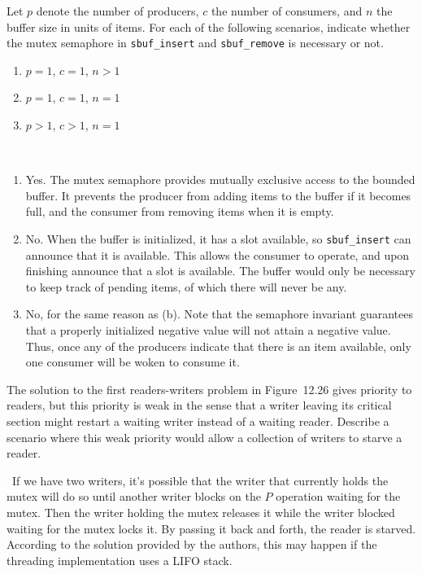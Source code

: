 \documentclass[12pt]{article}
\newenvironment{ex}[2][Exercise]{\begin{trivlist}
		\item[\hskip \labelsep {\bfseries #1}\hskip \labelsep {\bfseries #2.}]}{\end{trivlist}}
\newenvironment{sol}[1][Solution]{\begin{trivlist}
		\item[\hskip \labelsep {\bfseries #1:}]}{\end{trivlist}}
\begin{document}
\begin{ex}{12.9}
	Let $p$ denote the number of producers, $c$ the number of consumers, and $n$ the buffer size
	in units of items. For each of the following scenarios, indicate whether the mutex
	semaphore in \texttt{sbuf\_insert} and \texttt{sbuf\_remove} is necessary or not.
	\begin{enumerate}[label=(\alph*)]
		\item $p=1$, $c=1$, $n>1$
		\item $p=1$, $c=1$, $n=1$
		\item $p>1$, $c>1$, $n=1$
	\end{enumerate}
\end{ex}

\begin{sol}
	\
	\begin{enumerate}[label=(\alph*)]
		\item Yes. The mutex semaphore provides mutually exclusive access to the bounded buffer.
		It prevents the producer from adding items to the buffer if it becomes full, and
		the consumer from removing items when it is empty.
		\item No. When the buffer is initialized, it has a slot available, so \texttt{sbuf\_insert}
		can announce that it is available. This allows the consumer to operate, and upon
		finishing announce that a slot is available. The buffer would only be necessary to
		keep track of pending items, of which there will never be any.
		\item No, for the same reason as (b). Note that the semaphore invariant guarantees
		that a properly initialized negative value will not attain a negative value. Thus, once
		any of the producers indicate that there is an item available, only one consumer will
		be woken to consume it.
	\end{enumerate}
\end{sol}

\begin{ex}{12.10}
	The solution to the first readers-writers problem in Figure~12.26 gives priority to readers,
	but this priority is weak in the sense that a writer leaving its critical section might
	restart a waiting writer instead of a waiting reader. Describe a scenario where this weak
	priority would allow a collection of writers to starve a reader.
\end{ex}

\begin{sol}
	\
	If we have two writers, it's possible that the writer that currently holds the mutex will
	do so until another writer blocks on the $P$ operation waiting for the mutex. Then the
	writer holding the mutex releases it while the writer blocked waiting for the mutex
	locks it. By passing it back and forth, the reader is starved. According to the solution
	provided by the authors, this may happen if the threading implementation uses a LIFO stack.
\end{sol}
\end{document}
